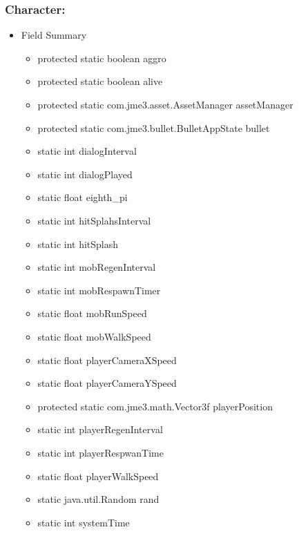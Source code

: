 \documentclass[letterpaper]{article}
\begin{document}
								\vspace{0.2in}
								\subsubsection*{Character:}
								\vspace{0.1in}
								
									\begin{itemize}
										\item	Field Summary
												\begin{itemize}
													\item	protected static boolean	aggro 
													\item	protected static boolean	alive 
													\item	protected static com.jme3.asset.AssetManager	assetManager 
													\item	protected static com.jme3.bullet.BulletAppState	bullet 
													\item	static int	dialogInterval 
													\item	static int	dialogPlayed 
													\item	static float	eighth\_pi 
													\item	static int	hitSplahsInterval 
													\item	static int	hitSplash 
													\item	static int	mobRegenInterval 
													\item	static int	mobRespawnTimer 
													\item	static float	mobRunSpeed 
													\item	static float	mobWalkSpeed 
													\item	static float	playerCameraXSpeed 
													\item	static float	playerCameraYSpeed 
													\item	protected static com.jme3.math.Vector3f	playerPosition 
													\item	static int	playerRegenInterval 
													\item	static int	playerRespwanTime 
													\item	static float	playerWalkSpeed 
													\item	static java.util.Random	rand 
													\item	static int	systemTime 
												\end{itemize}

\end{itemize}
\end{document}
